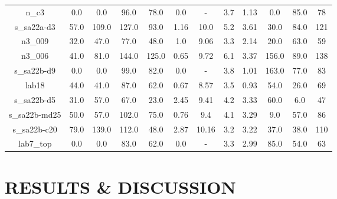 \documentclass[fleqn,usenatbib]{mn2e}
\begin{document}
\begin{table*}
\begin{tabular}{cccccccccccc}
n\_c3         & 0.0                    & 0.0                      & 96.0                  & 78.0                   & 0.0            & - & 3.7      & 1.13       & 0.0     & 85.0      & 78  \\
s\_sa22a-d3   & 57.0                    & 109.0                    & 127.0                 & 93.0                   & 1.16           & 10.0      & 5.2      & 3.61       & 30.0    & 84.0      & 121   \\
n3\_009       & 32.0                    & 47.0                     & 77.0                  & 48.0                   & 1.0            & 9.06      & 3.3      & 2.14       & 20.0    & 63.0      & 59 \\
n3\_006       & 41.0                    & 81.0                     & 144.0                 & 125.0                  & 0.65           & 9.72      & 6.1      & 3.37       & 156.0   & 89.0      & 138 \\
s\_sa22b-d9   & 0.0                    & 0.0                      & 99.0                  & 82.0                   & 0.0            & - & 3.8      & 1.01       & 163.0   & 77.0      & 83   \\
lab18         & 44.0                    & 41.0                     & 87.0                  & 62.0                   & 0.67           & 8.57      & 3.5      & 0.93       & 54.0    & 26.0      & 69 \\
s\_sa22b-d5   & 31.0                    & 57.0                     & 67.0                  & 23.0                   & 2.45           & 9.41      & 4.2      & 3.33       & 60.0    & 6.0       & 47 \\
s\_sa22b-md25 & 50.0                    & 57.0                     & 102.0                 & 75.0                   & 0.76           & 9.4       & 4.1      & 3.29       & 9.0     & 57.0      & 86 \\
s\_sa22b-c20  & 79.0                    & 139.0                    & 112.0                 & 48.0                   & 2.87           & 10.16     & 3.2      & 3.22       & 37.0    & 38.0      & 110 \\
lab7\_top     & 0.0                    & 0.0                      & 83.0                  & 62.0                   & 0.0            & - & 3.3      & 2.99       & 85.0    & 54.0      & 63  
\end{tabular}
\end{table*}


\section{RESULTS \& DISCUSSION}\label{sec:results}
\end{document}
